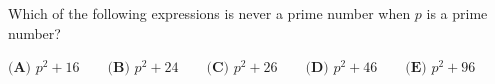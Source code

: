 Which of the following expressions is never a prime number when $p$ is a prime number?

$\textbf{(A) } p^2+16 \qquad \textbf{(B) } p^2+24 \qquad \textbf{(C) } p^2+26 \qquad \textbf{(D) } p^2+46 \qquad \textbf{(E) } p^2+96$
